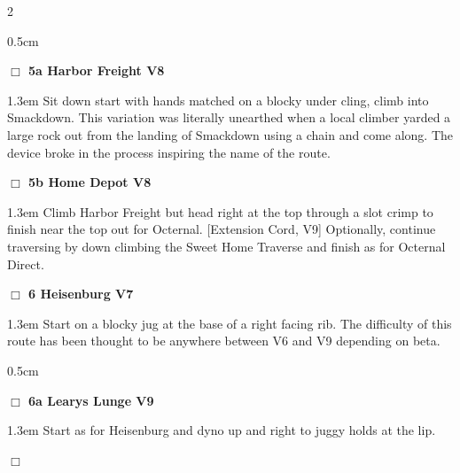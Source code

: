 \begin{multicols}{2}
\begin{adjustwidth}{0.5cm}{}				
\needspace{4em}
\needspace{2em}
\label{vr:Harbor Freight}
\colorbox{Goldenrod!20}{
\parbox{0.95\linewidth}{
\hspace{-1ex}\textbf{$\Box$
5a Harbor Freight V8  
}}}
\begin{adjustwidth}{1.3em}{}			
Sit down start with hands matched on a blocky under cling, climb into Smackdown. This variation was literally unearthed when a local climber yarded a large rock out from the landing of Smackdown using a chain and come along. The device broke in the process inspiring the name of the route.
\end{adjustwidth}
\needspace{2em}
\label{vr:Harbor Freight Right Exit}
\colorbox{Goldenrod!20}{
\parbox{0.95\linewidth}{
\hspace{-1ex}\textbf{$\Box$
5b Home Depot V8  
}}}
\begin{adjustwidth}{1.3em}{}			
Climb Harbor Freight but head right at the top through a slot crimp to finish near the top out for Octernal. [Extension Cord, V9] Optionally, continue traversing by down climbing the Sweet Home Traverse and finish as for Octernal Direct.
\end{adjustwidth}
\end{adjustwidth}
\needspace{2em}
\label{rt:Heisenburg}
\colorbox{Goldenrod!20}{
\parbox{0.95\linewidth}{
\hspace{-1ex}\textbf{$\Box$
6 Heisenburg V7  
}}}
\begin{adjustwidth}{1.3em}{}			
Start on a blocky jug at the base of a right facing rib. The difficulty of this route has been thought to be anywhere between V6 and V9 depending on beta.
\end{adjustwidth}
\begin{adjustwidth}{0.5cm}{}				
\needspace{4em}
\needspace{2em}
\label{vr:Learys Lunge}
\colorbox{Goldenrod!20}{
\parbox{0.95\linewidth}{
\hspace{-1ex}\textbf{$\Box$
6a Learys Lunge V9  
}}}
\begin{adjustwidth}{1.3em}{}			
Start as for Heisenburg and dyno up and right to juggy holds at the lip.
\end{adjustwidth}
\end{adjustwidth}
\needspace{2em}
\label{rt:Guillotine}
\colorbox{RoyalBlue!20}{
\parbox{0.95\linewidth}{
\hspace{-1ex}\textbf{$\Box$
}}}
\end{multicols}
